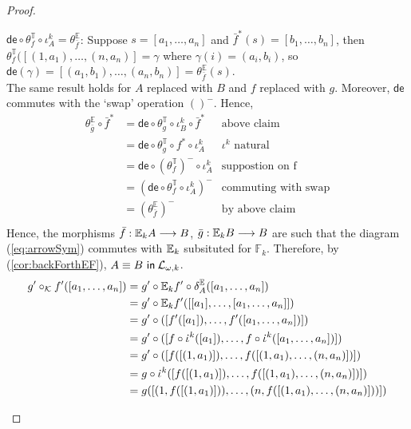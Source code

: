 \begin{prop}
\begin{proof}
\begin{enumerate}[label=(\arabic*)]
$\mathsf{de} \circ \theta^{\mathbb{T}}_{f} \circ \iota^{k}_{A} = \theta^{\mathbb{E}}_{\bar{f}}$: Suppose $s = [a_{1},\dots,a_{n}]$ and $\bar{f}^{*}(s) = [b_{1},\dots,b_{n}]$, then $\theta^{\mathbb{T}}_{f}([(1,a_{1}),\dots,(n,a_{n})] = \gamma$ where $\gamma(i) = (a_{i},b_{i})$, so $\mathsf{de}(\gamma) = [(a_{1},b_{1}),\dots,(a_{n},b_{n})] = \theta^{\mathbb{E}}_{\bar{f}}(s)$.  \\ 

The same result holds for $A$ replaced with $B$ and $f$ replaced with $g$. Moreover, $\mathsf{de}$ commutes with the `swap' operation $()^{-}$. Hence,
\begin{align*}
\theta_{\bar{g}}^{\mathbb{E}} \circ \bar{f}^{*}  &= \mathsf{de} \circ \theta_{g}^{\mathbb{T}} \circ \iota^{k}_{B} \circ \bar{f}^{*} & \text{above claim} \\
&= \mathsf{de} \circ \theta_{g}^{\mathbb{T}} \circ f^{*} \circ \iota^{k}_{A} & \text{$\iota^{k}$ natural} \\
&= \mathsf{de} \circ (\theta_{f}^{\mathbb{T}})^{-} \circ \iota^{k}_{A} & \text{suppostion on f} \\
&= (\mathsf{de} \circ \theta_{f}^{\mathbb{T}} \circ \iota^{k}_{A})^{-} & \text{commuting with swap} \\
&= (\theta_{\bar{f}}^{\mathbb{E}})^{-} & \text{by above claim} \\
\end{align*}
Hence, the morphisms $\bar{f}:{\mathbb{E}_{k}A} \longrightarrow B$, $\bar{g}:{\mathbb{E}_{k}B} \longrightarrow B$ are such that the diagram (\ref{eq:arrowSym}) commutes with ${\mathbb{E}_{k}}$ subsituted for $\mathbb{F}_{k}$. Therefore, by (\ref{cor:backForthEF}), ${A \equiv B \ \mathsf{in}\: \mathcal{L}_{\omega,k}}$.
\begin{align*}
g' \circ_{\mathcal{K}} f'([a_{1},\dots,a_{n}]) &= g' \circ \efcomonad{k}{f'} \circ \delta^{\efcomonad{}{}}_{A}([a_{1},\dots,a_{n}]) \\
&= g' \circ \efcomonad{k}{f'}([[a_{1}],\dots,[a_{1},\dots,a_{n}]]) \\
&= g' \circ ([f'([a_{1}]),\dots,f'([a_{1},\dots,a_{n}])]) \\
&= g' \circ ([f \circ \iota^{k}([a_{1}]),\dots,f \circ \iota^{k}([a_{1},\dots,a_{n}])]) \\
&= g' \circ ([f([(1,a_{1})]),\dots,f([(1,a_{1}),\dots,(n,a_{n})])]) \\
&= g \circ \iota^{k} ([f([(1,a_{1})]),\dots,f([(1,a_{1}),\dots,(n,a_{n})])]) \\
&= g ([(1,f([(1,a_{1})])),\dots,(n,f([(1,a_{1}),\dots,(n,a_{n})]))]) \\

\end{align*}
\end{enumerate}
\end{proof}
\end{prop}
